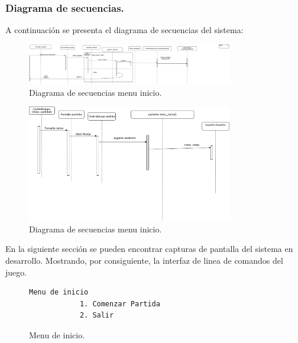 \subsubsection{Diagrama de secuencias.}\label{cap:diagrama-secuencias}
A continuación se presenta el diagrama de secuencias del sistema:
\begin{figure}[H]
    \centering
        \includegraphics[width=0.8\textwidth]{imagenes/diagramas/secuencia-inicio.png}
    \caption{Diagrama de secuencias menu inicio.}
\end{figure}
\begin{figure}[H]
    \centering
        \includegraphics[width=0.8\textwidth]{imagenes/diagramas/secuencia2.drawio.png}
    \caption{Diagrama de secuencias menu inicio.}
\end{figure}

En la siguiente sección se pueden encontrar capturas de pantalla del sistema en desarrollo. Mostrando, por consiguiente, la interfaz de linea de comandos del juego.
\begin{figure}[H]
    \begin{lstlisting}[language= bash]
        Menu de inicio
            1. Comenzar Partida
            2. Salir
    \end{lstlisting}
    \caption{Menu de inicio.}
\end{figure}
